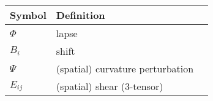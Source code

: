 
\begin{tabular}{lll}
 \toprule
  Symbol & Definition \\
 \midrule
 \midrule
 $\Phi$ & lapse \\
 $B_i$ & shift \\
 $\Psi$ & (spatial) curvature perturbation  \\
 $E_{ij}$ & (spatial) shear (3-tensor) \\
 \bottomrule
\end{tabular}
